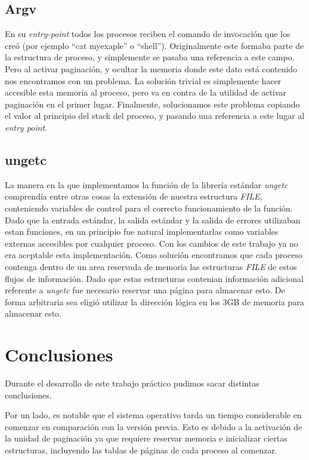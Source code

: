 \documentclass[a4paper,10pt]{article}
\begin{document}
        \subsection{Argv}
        En su \textit{entry-point} todos los procesos reciben el comando de invocación que los creó (por ejemplo ``cat myexaple'' o ``shell'').
        Originalmente este formaba parte de la estructura de proceso, y simplemente se pasaba una referencia a este campo.
        Pero al activar paginación, y ocultar la memoria donde este dato está contenido nos encontramos con un problema.
        La solución trivial es simplemente hacer accesible esta memoria al proceso, pero va en contra de la utilidad de activar paginación en el primer lugar.
        Finalmente, solucionamos este problema copiando el valor al principio del stack del proceso, y pasando una referencia a este lugar al \textit{entry point}.

	\subsection{ungetc}

	La manera en la que implementamos la función de la librería estándar \textit{ungetc} comprendía entre otras cosas la
	extensión de nuestra estructura \textit{FILE}, conteniendo variables de control para el correcto funcionamiento de la función.
	Dado que la entrada estándar, la salida estándar y la salida de errores utilizaban estan funciones, en un principio fue		
	natural implementarlas como variables externas accesibles por cualquier proceso. Con los cambios de este trabajo ya no era
	aceptable esta implementación.
	Como solución encontramos que cada proceso contenga dentro de un area reservada de memoria las estructuras \textit{FILE} de 
	estos flujos de información. Dado que estas estructuras contenian información adicional referente a \textit{ungetc} fue 
	necesario reservar una página para almacenar esto. De forma arbitraria sea eligió utilizar la dirección lógica en los 3GB 
	de memoria para almacenar esto.

\newpage

\section{Conclusiones}

Durante el desarrollo de este trabajo práctico pudimos sacar distintas conclusiones.

Por un lado, es notable que el sistema operativo tarda un tiempo considerable en comenzar en comparación con la versión previa.
Esto es debido a la activación de la unidad de paginación ya que requiere reservar memoria e inicializar ciertas estructuras, 
incluyendo las tablas de páginas de cada proceso al comenzar. 
\end{document}
